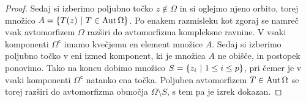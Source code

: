 \begin{proof}
Sedaj si izberimo poljubno točko $z \not \in \Omega$ in si oglejmo
njeno orbito, torej množico $A = \left\{T(z)~\middle\vert~T \in \operatorname{Aut} \Omega\right\}$.
Po enakem razmisleku kot zgoraj se namreč vsak avtomorfizem
$\Omega$ razširi do avtomorfizma kompleksne ravnine. V vsaki
komponenti $\Omega^\mathsf{c}$ imamo kvečjemu en element množice
$A$. Sedaj si izberimo poljubno točko v eni izmed komponent, ki je
množica $A$ ne obišče, in postopek ponovimo. Tako na koncu dobimo
množico $S = \left\{z_i~\middle\vert~1 \leq i \leq p\right\}$, pri čemer je v vsaki
komponenti $\Omega^\mathsf{c}$ natanko ena točka. Poljuben
avtomorfizem $T \in \operatorname{Aut} \Omega$ se torej razširi do avtomorfizma
območja $\Omega \setminus S$, s tem pa je izrek dokazan.
\end{proof}

